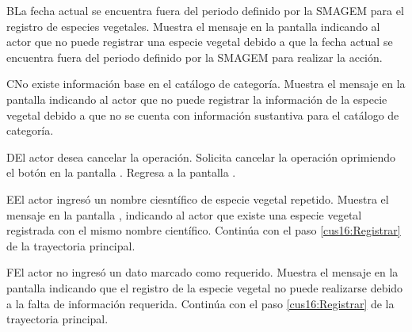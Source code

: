    \begin{UCtrayectoriaA}{B}{La fecha actual se encuentra fuera del periodo definido por la SMAGEM para el registro de especies vegetales.}
    \UCpaso[\UCsist] Muestra el mensaje  en la pantalla  indicando al actor que no puede registrar una especie vegetal debido a que la fecha actual se encuentra fuera del periodo definido por la SMAGEM para realizar la acción. 
 \end{UCtrayectoriaA}
 
 \begin{UCtrayectoriaA}{C}{No existe información base en el catálogo de categoría.}
    \UCpaso[\UCsist] Muestra el mensaje  en la pantalla  indicando al actor que no puede registrar la información de la especie vegetal debido a que no se cuenta con información sustantiva para el catálogo de categoría.
    \end{UCtrayectoriaA}
 
    \begin{UCtrayectoriaA}{D}{El actor desea cancelar la operación.}
    \UCpaso[\UCactor] Solicita cancelar la operación oprimiendo el botón  en la pantalla .
    \UCpaso[\UCsist] Regresa a la pantalla . 
    \end{UCtrayectoriaA}
  
   \begin{UCtrayectoriaA}{E}{El actor ingresó un nombre ciesntífico de especie vegetal repetido.}
    \UCpaso[\UCsist] Muestra el mensaje  en la pantalla , indicando al actor que existe una especie vegetal registrada con el mismo nombre científico.
    \UCpaso[] Continúa con el paso \ref{cus16:Registrar} de la trayectoria principal.
    \end{UCtrayectoriaA}
 
    \begin{UCtrayectoriaA}{F}{El actor no ingresó un dato marcado como requerido.}    
    \UCpaso[\UCsist] Muestra el mensaje  en la pantalla  indicando que el registro de la especie vegetal no puede realizarse debido a la falta de información requerida.
    \UCpaso[] Continúa con el paso \ref{cus16:Registrar} de la trayectoria principal.     
    \end{UCtrayectoriaA}
 
